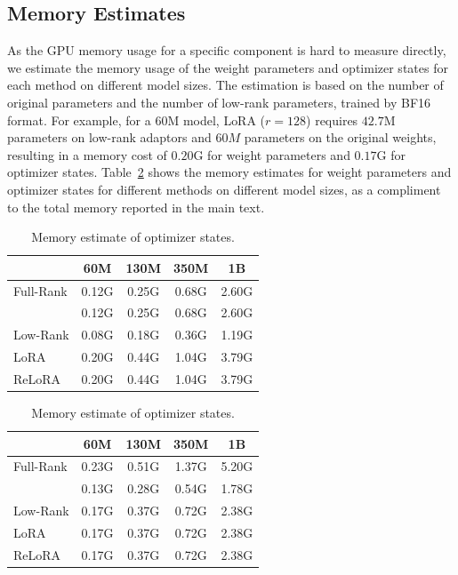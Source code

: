 \subsection{Memory Estimates}
As the GPU memory usage for a specific component is hard to measure directly, we estimate the memory usage of the weight parameters and optimizer states for each method on different model sizes.
The estimation is based on the number of original parameters and the number of low-rank parameters, trained by BF16 format.
For example, for a 60M model, LoRA ($r=128$) requires $42.7$M parameters on low-rank adaptors and $60M$ parameters on the original weights, resulting in a memory cost of $0.20$G for weight parameters and $0.17$G for optimizer states.
Table~\ref{tab:memory_estimate} shows the memory estimates for weight parameters and optimizer states for different methods on different model sizes, as a compliment to the total memory reported in the main text.

\begin{table}[h]
    \caption{Memory estimates for weight parameters and optimizer states.}
    \label{tab:memory_estimate}
    \begin{subtable}{.5\linewidth}
        \centering
        \caption{Memory estimate of weight parameters.}
        \begin{tabular}{lcccc}
        \toprule
                   & \textbf{60M} & \textbf{130M} & \textbf{350M} & \textbf{1B} \\
        \midrule
        Full-Rank & 0.12G & 0.25G & 0.68G & 2.60G \\
        \midrule
        \textbf{\lowrank{}} & 0.12G & 0.25G & 0.68G & 2.60G \\
        Low-Rank & 0.08G & 0.18G & 0.36G & 1.19G \\
        LoRA & 0.20G & 0.44G & 1.04G & 3.79G \\
        ReLoRA & 0.20G & 0.44G & 1.04G & 3.79G \\
        \bottomrule
        \end{tabular}
    \end{subtable}%
    \begin{subtable}{.5\linewidth}
        \centering
        \caption{Memory estimate of optimizer states.}
        \begin{tabular}{lcccc}
        \toprule
                   & \textbf{60M} & \textbf{130M} & \textbf{350M} & \textbf{1B} \\
        \midrule
        Full-Rank & 0.23G & 0.51G & 1.37G & 5.20G \\
        \midrule
        \textbf{\lowrank{}} & 0.13G & 0.28G & 0.54G & 1.78G \\
        Low-Rank & 0.17G & 0.37G & 0.72G & 2.38G \\
        LoRA & 0.17G & 0.37G & 0.72G & 2.38G \\
        ReLoRA & 0.17G & 0.37G & 0.72G & 2.38G \\
        \bottomrule
        \end{tabular}
    \end{subtable}
\end{table}

